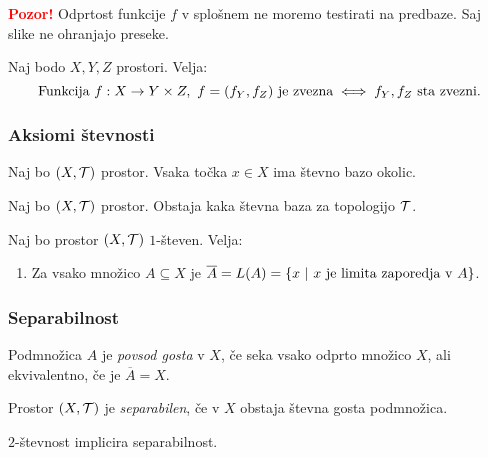 \textbf{\textcolor{red}{Pozor!}} Odprtost funkcije $f$ v splošnem ne moremo testirati na predbaze. Saj slike ne ohranjajo preseke.

\begin{trditev}
    Naj bodo $X, Y, Z$ prostori. Velja:
    $$\text{Funkcija } f:X \to Y \times Z, \ f = (f_Y, f_Z) \text{ je zvezna} \iff f_Y, f_Z \text{ sta zvezni}.$$
\end{trditev}

\subsubsection{Aksiomi števnosti}

\begin{definicija}
    Naj bo $(X, \mathcal{T})$ prostor. Vsaka točka $x \in X$ ima števno bazo okolic.
\end{definicija}

\begin{definicija}
    Naj bo $(X, \mathcal{T})$ prostor. Obstaja kaka števna baza za topologijo $\mathcal{T}$.
\end{definicija}

\begin{trditev}
    Naj bo prostor $(X, \mathcal{T})$ $1$-števen. Velja:
    \begin{enumerate}
        \item Za vsako množico $A \subseteq X$ je $\overline{A} = L(A) = \left\{x \ | \ x \text{ je limita zaporedja v } A\right\}$.
    \end{enumerate}
\end{trditev}

\subsubsection{Separabilnost}
\begin{definicija}
    Podmnožica $A$ je \emph{povsod gosta} v $X$, če seka vsako odprto množico $X$, ali ekvivalentno, če je $\overline{A} = X$.
\end{definicija}

\begin{definicija}
    Prostor $(X, \mathcal{T})$ je \emph{separabilen}, če v $X$ obstaja števna gosta podmnožica.
\end{definicija}

\begin{trditev}
    $2$-števnost implicira separabilnost.
\end{trditev}

